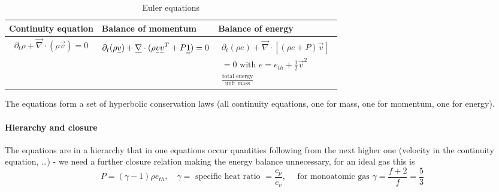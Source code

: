 \begin{table}[!htb]
    \centering
    \begin{tabular}{|p{}|p{}|p{}|}
        \hline
        \textcolor{blue1}{Continuity equation} & \textcolor{blue1}{Balance of momentum} &  \textcolor{blue1}{Balance of energy} \\
        \hline
        \begin{equation}
            \partial_t \rho + \vec{\nabla} \cdot (\rho \vec{v}) = 0
        \end{equation} &
        \begin{equation}
            \partial_t (\rho \vec{v}) + \vec{\nabla} \cdot (\rho \vec{v}\vec{v}^T + P\mat{1}) = 0
        \end{equation} &
        \begin{equation}
            \begin{gathered}
                \partial_t (\rho e) + \vec{\nabla} \cdot \left[(\rho e + P)\vec{v} \right]\\ = 0 
                \text{ with } e = e_{th} + \frac{1}{2} \vec{v}^2 \\
                \frac{\text{total energy}}{\text{unit mass}}
            \end{gathered}
        \end{equation} \\
        \hline
    \end{tabular}
    \caption{Euler equations}
    \label{tab:euler_eq}
\end{table}
The equations form a set of hyperbolic conservation laws (all continuity equations, one for mass, one for momentum, one for energy).
\paragraph{Hierarchy and closure} The equations are in a hierarchy that in one 
equations occur quantities following from the next higher one (velocity in the 
continuity equation, …) - we need a further closure relation making the energy 
balance unnecessary, for an ideal gas this is
\begin{equation}
    P = (\gamma - 1) \rho e_{th}, \quad \gamma = \text{ specific heat ratio } = \frac{c_p}{c_v}, \quad \text{ for monoatomic gas } \gamma = \frac{f+2}{f} = \frac{5}{3}
\end{equation}


